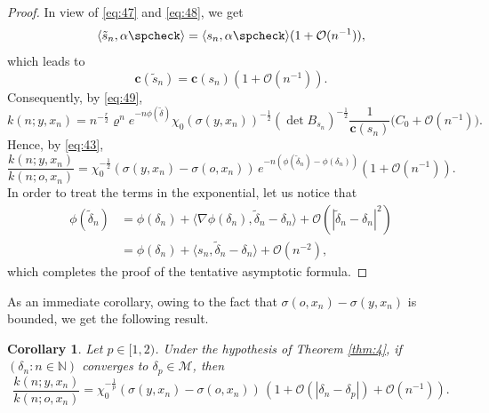 \documentclass[11pt]{amsart}
\newcommand{\NN}{\mathbb{N}}
\newcommand{\calO}{\mathcal{O}}
\newcommand{\calM}{\mathcal{M}}
\newcommand{\bfc}{\mathbf{c}}
\newcommand{\sprod}[2]{\langle {#1}, {#2} \rangle}
\theoremstyle{plain}
\newcounter{thm}
\newtheorem{corollary}[theorem]{Corollary}
\theoremstyle{definition}
\numberwithin{equation}{section}
\begin{document}
\begin{proof}
	In view of \eqref{eq:47} and \eqref{eq:48}, we get
	\[
		\sprod{\tilde{s}_n}{\alpha\spcheck} = \sprod{s_n}{\alpha\spcheck}
		(1+\calO(n^{-1})),
	\]
	which leads to
	\[
		\bfc(\tilde{s}_n) = \bfc(s_n) (1+\calO(n^{-1})).
	\]
	Consequently, by \eqref{eq:49},
	\[
		k(n; y, x_n) = 
		n^{-\frac{r}2} \varrho^n e^{-n\phi(\tilde{\delta})} \chi_0(\sigma(y, x_n))^{-\frac{1}{2}}
		(\det B_{s_n})^{-\frac{1}{2}} \frac{1}{\bfc(s_n)} \Big(C_0 + \mathcal{O}(n^{-1})\Big).
	\]
	Hence, by \eqref{eq:43},
	\begin{equation*}
		\frac{k(n; y, x_n)}{k(n;o,x_n)} = 
		\chi_0^{-\frac{1}{2}}(\sigma(y,x_n)-\sigma(o,x_n))\,e^{-n(\phi(\tilde{\delta}_n)-\phi(\delta_n))}
		(1+\calO(n^{-1})).
	\end{equation*}
	In order to treat the terms in the exponential, let us notice that
	\begin{align*}
		\phi(\tilde{\delta}_n)
		&=\phi(\delta_n)+\sprod{\nabla\phi(\delta_n)}{\tilde{\delta}_n-\delta_n}+\calO(|\tilde{\delta}_n-\delta_n|^2)\\
		&=\phi(\delta_n)+\langle s_n,\widetilde{\delta}_n-\delta_n\rangle+\mathcal{O}(n^{-2}),
	\end{align*}
	which completes the proof of the tentative asymptotic formula.
\end{proof}	

As an immediate corollary, owing to the fact that $\sigma(o,x_n)-\sigma(y,x_n)$ is bounded, we get the following result.
\begin{corollary}
	\label{cor:2}
	Let $p \in [1, 2)$. Under the hypothesis of Theorem \ref{thm:4}, if $(\delta_n : n \in \NN)$ converges to 
	$\delta_p \in \calM$, then 
	\[ 
		\frac{k(n; y, x_n)}{k(n;o,x_n)}
		=
		\chi_0^{-\frac{1}{p}}(\sigma(y,x_n)-\sigma(o,x_n))\, 
		(1+\calO(|\delta_n - \delta_p|) + \calO(n^{-1})).
	\]
\end{corollary}
\end{document}

